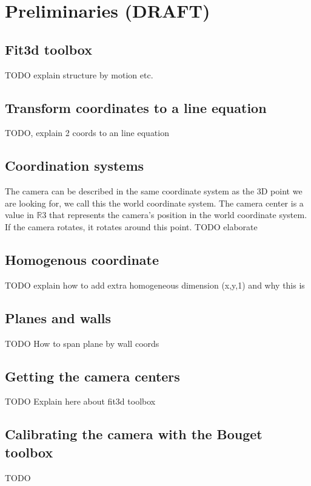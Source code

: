 \section{Preliminaries (DRAFT)}
\subsection{Fit3d toolbox}
TODO explain structure by motion etc.

\subsection{Transform coordinates to a line equation}
TODO, explain 2 coords to an line equation


\subsection{Coordination systems}
The camera can be described in the same coordinate system as the 3D point we are
looking for, we call this the world coordinate system. 
The camera center is a value in $\mathbb{R}$3 that represents the camera's position in the world
coordinate system. If the camera rotates, it rotates around this point.
TODO elaborate\\

\subsection{Homogenous coordinate}
TODO explain how to add extra homogeneous dimension (x,y,1) and why this is


\subsection{Planes and walls}
TODO How to span plane by wall coords

\subsection{Getting the camera centers}
TODO Explain here about fit3d toolbox

\subsection{Calibrating the camera with the Bouget toolbox}
TODO


